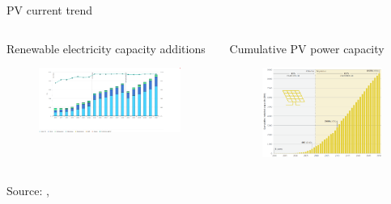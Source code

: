 \documentclass[aspectratio=169, 12pt]{beamer}
\begin{document}
\begin{frame}{PV current trend}{\insertsubsection}
\begin{columns}
  \begin{column}{0.6\columnwidth}
    Renewable electricity capacity additions
    \begin{figure}
    \centering
    \includegraphics[width=\columnwidth]{figure/rec_shares.png}
  \end{figure}
\end{column}
\begin{column}{0.4\columnwidth}
  Cumulative PV power capacity
  \begin{figure}
    \centering
    \includegraphics[width=\columnwidth]{figure/pv_installation.png}
    \end{figure}
  \end{column}
\end{columns}

  {\tiny Source: \cite{irena2019}, \cite{iea2023}}
\end{frame}
\end{document}
